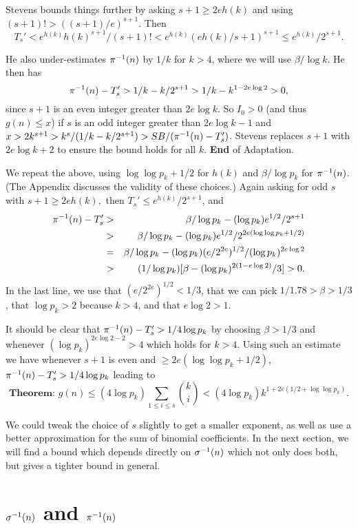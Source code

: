 \documentclass[12pt,leqno]{article}
\begin{document}
Stevens bounds things further by asking
$s+1 \geq 2eh(k)$ and using $(s+1)! \gt ((s+1)/e)^{s+1}$.  Then
$$T_s' \lt e^{h(k)} h(k)^{s+1}/(s+1)! 
\lt e^{h(k)} (eh(k)/s+1)^{s+1} \leq e^{h(k)}/2^{s+1}.$$

He also under-estimates ${\pi}^{-1}(n)$ by $1/k$ for $k \gt 4$, 
where we will use $\beta/\log k$.  He then has 
$${\pi}^{-1}(n) - T_s' > 1/k - k/2^{s+1} > 1/k - k^{1 - 2e\log 2} > 0,$$
since $s+1$ is an even integer greater than $2e \log k$.  
So $I_0 \gt 0$ (and thus $g(n) \leq x$) if $s$ is an odd 
integer greater than $2e\log k - 1$ and 
$x > 2k^{s+1} > k^s / ( 1/k - k/2^{s+1}) > SB/({\pi}^{-1}(n) - T_s')$.
Stevens replaces $s+1$ with $2e\log k + 2$ 
to ensure the bound holds for all $k$.  \textbf{End} of Adaptation.

We repeat the above, using $\log\log p_k + 1/2$ for $h(k)$
 and $\beta/\log p_k$ for ${\pi}^{-1}(n)$. (The Appendix discusses the validity of
these choices.)
  Again asking for odd $s$ with
 $s+1 \geq 2eh(k),$ then  $T_s' \leq e^{h(k)}/2^{s+1}$, and
\begin{eqnarray*}
{\pi}^{-1}(n) - T_s' & > & \beta/\log p_k - (\log p_k)e^{1/2}/2^{s+1} \\
       & > & \beta/\log p_k - (\log p_k)e^{1/2}/2^{2e(\log\log p_k +1/2)} \\
       & =   & \beta/\log p_k - (\log p_k)(e/2^{2e})^{1/2} /(\log p_k)^{2e\log 2} \\
       & > & (1/\log p_k)[\beta - (\log p_k)^{2(1 - e\log2)}/3] > 0 .
\end{eqnarray*}
In the last line, we use that $(e/2^{2e})^{1/2} \lt 1/3$,
that we can pick $1/1.78 \gt \beta \gt 1/3$, that $\log p_k \gt 2$ because $k > 4$, 
and that $e\log 2 \gt 1$.  

It should be clear that ${\pi}^{-1}(n) - T_s' > 1/4\log p_k$ by choosing $\beta \gt 1/3$
and whenever $(\log p_k)^{2e\log 2 -2} > 4$ which holds for $k > 4$.  Using such an estimate
we have whenever $s+1$ is even and $ \geq 2e(\log\log p_k +1/2)$, ${\pi}^{-1}(n) -T_s' > 1/4\log p_k$ leading to
$$\textbf{Theorem: } g(n) \leq (4\log p_k) \sum_{1\leq i \leq s} {k \choose i} 
\lt (4\log p_k) k^{1 + 2e(1/2 + \log\log p_k)}.$$

We could tweak the choice of $s$ slightly to get a smaller exponent, as well as use a better
approximation for the sum of binomial coefficients.  In the next section, we will find a
bound which depends directly on ${\sigma}^{-1}(n)$ which not only does both, but gives a tighter bound
in general.

\section{${\sigma}^{-1}(n)$ and ${\pi}^{-1}(n)$}
\end{document}
